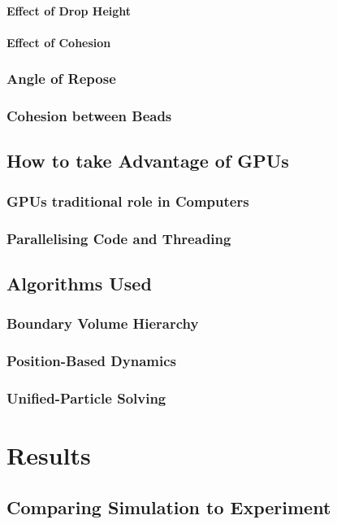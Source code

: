 \documentclass{book}
\begin{document}
\subsubsection{Effect of Drop Height}
\subsubsection{Effect of Cohesion}
\subsection{Angle of Repose}
\subsection{Cohesion between Beads}

\section{How to take Advantage of GPUs}
\subsection{GPUs traditional role in Computers}
\subsection{Parallelising Code and Threading}

\section{Algorithms Used}
\subsection{Boundary Volume Hierarchy}
\subsection{Position-Based Dynamics}
\subsection{Unified-Particle Solving}

\chapter{Results}
\section{Comparing Simulation to Experiment}
\end{document}
